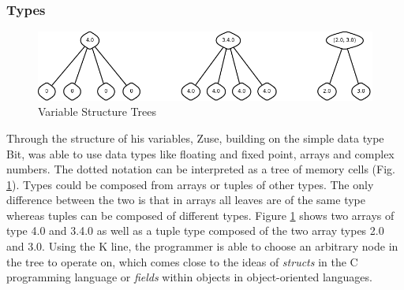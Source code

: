 \documentclass{llncs}
\begin{document}
 \subsubsection{Types}
   \begin{figure}[tb]
     \begin{center}
       \includegraphics[width=\linewidth]{img/trees}
     \end{center}
     \caption{Variable Structure Trees}
     \label{fig:trees}
   \end{figure}
   Through the structure of his variables, Zuse, building on the simple data type Bit, was able
   to use data types like floating and fixed point, arrays and complex numbers\cite{epegmagHorstzuse}. 
   The dotted notation can be interpreted as a tree of memory cells (Fig. \ref{fig:trees}). 
   Types could be composed from arrays or tuples of other types. The only difference between the two 
   is that in arrays all leaves are of the same type whereas tuples can be composed of different 
   types. Figure \ref{fig:trees} shows two arrays of type 4.0 and 3.4.0 as well as a tuple type 
   composed of the two array types 2.0 and 3.0. Using the K line, the programmer is able to choose
   an arbitrary node in the tree to operate on, which comes close to the ideas of \emph{structs} in
   the C programming language or \emph{fields} within objects in object-oriented languages.
\end{document}
